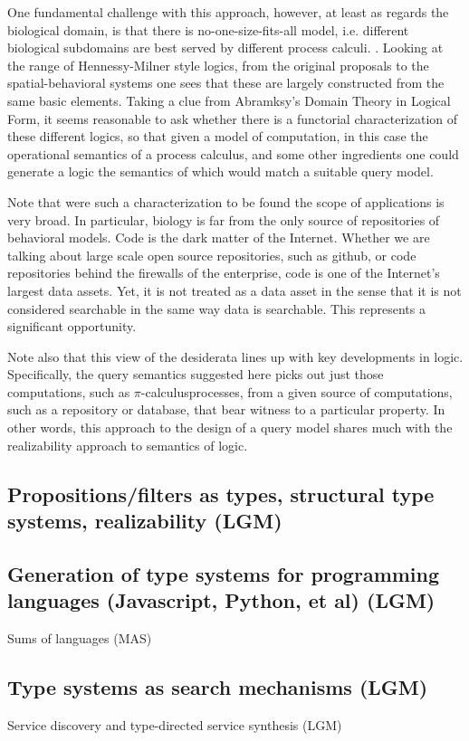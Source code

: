 \documentclass{article}
\renewcommand{\:}{\colon}
\newcommand{\pic}{$\pi$-calculus}
\begin{document}
One fundamental challenge with this approach, however, at least as
regards the biological domain, is that there is no-one-size-fits-all
model, i.e. different biological subdomains are best served by
different process calculi. \cite{CardelliSurvey}. Looking at the range
of Hennessy-Milner style logics, from the original proposals to the
spatial-behavioral systems one sees that these are largely constructed
from the same basic elements. Taking a clue from Abramksy's Domain
Theory in Logical Form, it seems reasonable to ask whether there is a
functorial characterization of these different logics, so that given a
model of computation, in this case the operational semantics of a
process calculus, and some other ingredients one could generate a
logic the semantics of which would match a suitable query model.

Note that were such a characterization to be found the scope of
applications is very broad. In particular, biology is far from the
only source of repositories of behavioral models. Code is the dark
matter of the Internet. Whether we are talking about large scale open
source repositories, such as github, or code repositories behind the
firewalls of the enterprise, code is one of the Internet's largest
data assets. Yet, it is not treated as a data asset in the sense that
it is not considered searchable in the same way data is
searchable. This represents a significant opportunity.

Note also that this view of the desiderata lines up with key
developments in logic. Specifically, the query semantics suggested here picks out
just those computations, such as \pic processes, from a given source
of computations, such as a repository or database, that bear witness to a particular
property. In other words, this approach to the design of a query model
shares much with the realizability approach to semantics of logic. 
\subsection{Propositions/filters as types, structural type systems, realizability (LGM)}
\subsection{Generation of type systems for programming languages (Javascript, Python, et al) (LGM)}
  Sums of languages (MAS)
\subsection{Type systems as search mechanisms (LGM)}
  Service discovery and type-directed service synthesis (LGM)
\end{document}

